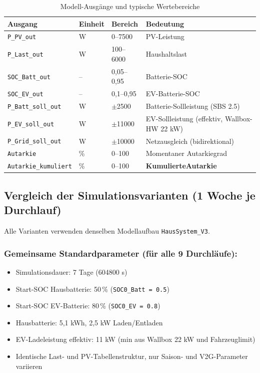 \documentclass[conference]{IEEEtran}
\begin{document}
\begin{table}[h]
\caption{Modell-Ausgänge und typische Wertebereiche}
\centering
\footnotesize
\begin{tabularx}{\columnwidth}{@{}p{2.2cm}p{0.8cm}p{1.1cm}X@{}}
\toprule
\textbf{Ausgang} & \textbf{Einheit} & \textbf{Bereich} & \textbf{Bedeutung} \\
\midrule
\texttt{P\_PV\_out} & W & 0--7500 & PV-Leistung \\
\texttt{P\_Last\_out} & W & 100--6000 & Haushaltslast \\
\texttt{SOC\_Batt\_out} & -- & 0,05--0,95 & Batterie-SOC \\
\texttt{SOC\_EV\_out} & -- & 0,1--0,95 & EV-Batterie-SOC \\
\texttt{P\_Batt\_soll\_out} & W & $\pm$2500 & Batterie-Sollleistung (SBS 2.5) \\
\texttt{P\_EV\_soll\_out} & W & $\pm$11000 & EV-Sollleistung (effektiv, Wallbox-HW 22 kW) \\
\texttt{P\_Grid\_soll\_out} & W & $\pm$10000 & Netzausgleich (bidirektional) \\
\texttt{Autarkie} & \% & 0--100 & Momentaner Autarkiegrad \\
\texttt{Autarkie\_\newline kumuliert} & \% & 0--100 & \textbf{Kumulierte\newline Autarkie} \\
\bottomrule
\end{tabularx}
\end{table}

\subsection{Vergleich der Simulationsvarianten (1 Woche je Durchlauf)}

Alle Varianten verwenden denselben Modellaufbau \texttt{HausSystem\_V3}.

\subsubsection{Gemeinsame Standardparameter (für alle 9 Durchläufe):}
\begin{itemize}
\item Simulationsdauer: 7 Tage (604800 s)
\item Start-SOC Hausbatterie: 50\,\% (\texttt{SOC0\_Batt = 0.5})
\item Start-SOC EV-Batterie: 80\,\% (\texttt{SOC0\_EV = 0.8})
\item Hausbatterie: 5,1 kWh, 2,5 kW Laden/Entladen
\item EV-Ladeleistung effektiv: 11 kW (min aus Wallbox 22 kW und Fahrzeuglimit)
\item Identische Last- und PV-Tabellenstruktur, nur Saison- und V2G-Parameter variieren
\end{itemize}
\end{document}
